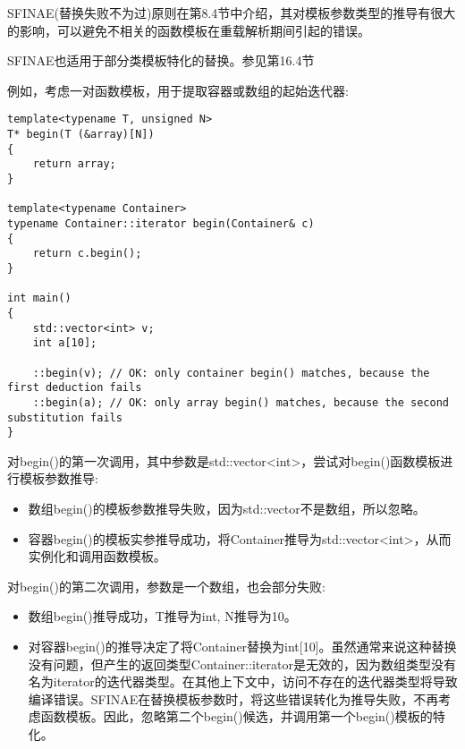 

SFINAE(替换失败不为过)原则在第8.4节中介绍，其对模板参数类型的推导有很大的影响，可以避免不相关的函数模板在重载解析期间引起的错误。

\begin{tcolorbox}[colback=webgreen!5!white,colframe=webgreen!75!black]
\hspace*{0.75cm}SFINAE也适用于部分类模板特化的替换。参见第16.4节
\end{tcolorbox}

例如，考虑一对函数模板，用于提取容器或数组的起始迭代器:

\begin{lstlisting}[style=styleCXX]
template<typename T, unsigned N>
T* begin(T (&array)[N])
{
	return array;
}

template<typename Container>
typename Container::iterator begin(Container& c)
{
	return c.begin();
}

int main()
{
	std::vector<int> v;
	int a[10];
	
	::begin(v); // OK: only container begin() matches, because the first deduction fails
	::begin(a); // OK: only array begin() matches, because the second substitution fails
}
\end{lstlisting}

对begin()的第一次调用，其中参数是std::vector<int>，尝试对begin()函数模板进行模板参数推导:

\begin{itemize}
\item 
数组begin()的模板参数推导失败，因为std::vector不是数组，所以忽略。

\item 
容器begin()的模板实参推导成功，将Container推导为std::vector<int>，从而实例化和调用函数模板。
\end{itemize}

对begin()的第二次调用，参数是一个数组，也会部分失败:

\begin{itemize}
\item 
数组begin()推导成功，T推导为int, N推导为10。

\item 
对容器begin()的推导决定了将Container替换为int[10]。虽然通常来说这种替换没有问题，但产生的返回类型Container::iterator是无效的，因为数组类型没有名为iterator的迭代器类型。在其他上下文中，访问不存在的迭代器类型将导致编译错误。SFINAE在替换模板参数时，将这些错误转化为推导失败，不再考虑函数模板。因此，忽略第二个begin()候选，并调用第一个begin()模板的特化。
\end{itemize}

